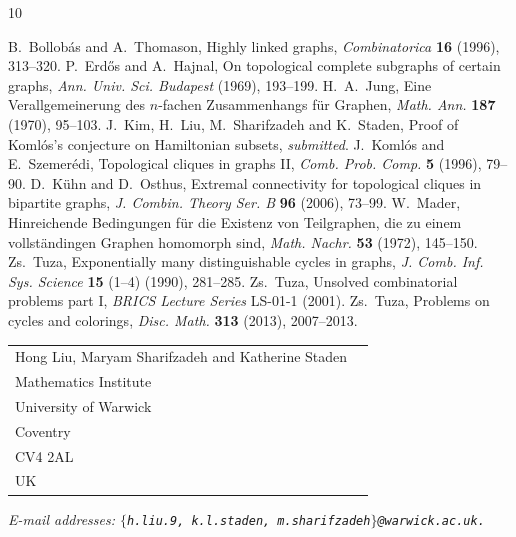 \documentclass[12pt]{amsart}
\begin{document}
\begin{thebibliography}{10}

 B.~Bollob\'as and A.~Thomason, Highly linked graphs, \emph{Combinatorica} {\bf 16} (1996), 313--320.
 P.~Erd\H{o}s and A.~Hajnal, On topological complete subgraphs of certain graphs, \emph{Ann. Univ. Sci. Budapest} (1969), 193--199.
 H.~A.~Jung, Eine Verallgemeinerung des $n$-fachen Zusammenhangs f\"{u}r Graphen, \emph{Math. Ann.} {\bf 187} (1970), 95--103.
 J.~Kim, H.~Liu, M.~Sharifzadeh and K.~Staden, Proof of Koml\'os's conjecture on Hamiltonian subsets, \emph{submitted}.
 J.~Koml\'os and E.~Szemer\'edi, Topological cliques in graphs II, \emph{Comb. Prob. Comp.} {\bf 5} (1996), 79--90.
 D.~K{\"u}hn and D.~Osthus, Extremal connectivity for topological cliques in bipartite graphs, \emph{J. Combin. Theory Ser. B} {\bf 96} (2006), 73--99.
 W.~Mader, Hinreichende Bedingungen f\"{u}r die Existenz von Teilgraphen, die zu einem vollst\"{a}ndingen Graphen homomorph sind, \emph{Math. Nachr.} {\bf 53} (1972), 145--150.
 Zs.~Tuza, Exponentially many distinguishable cycles in graphs, \emph{J. Comb. Inf. Sys. Science} {\bf 15} (1--4) (1990), 281--285.
 Zs.~Tuza, Unsolved combinatorial problems part I, \emph{BRICS Lecture Series} LS-01-1 (2001).
 Zs.~Tuza, Problems on cycles and colorings, \emph{Disc. Math.} {\bf 313} (2013), 2007--2013.

\end{thebibliography}

\medskip

{\footnotesize \obeylines \parindent=0pt

\begin{tabular}{ll}
Hong Liu, Maryam Sharifzadeh and Katherine Staden            \\
Mathematics Institute		  		 \\
University of Warwick\\
Coventry                             			\\
CV4 2AL				  			\\
UK						     \\
\end{tabular}
}


\begin{flushleft}
{\it{E-mail addresses}:
\tt{$\lbrace$h.liu.9, k.l.staden, m.sharifzadeh$\rbrace$@warwick.ac.uk.}}
\end{flushleft}
\end{document}
